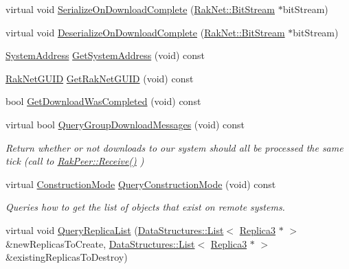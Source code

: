 \begin{DoxyCompactItemize}
\item 
virtual void \hyperlink{class_rak_net_1_1_connection___r_m3_a536d4413a4243b6732bc2a503d14d03e}{Serialize\-On\-Download\-Complete} (\hyperlink{class_rak_net_1_1_bit_stream}{Rak\-Net\-::\-Bit\-Stream} $\ast$bit\-Stream)
\item 
virtual void \hyperlink{class_rak_net_1_1_connection___r_m3_a293a2c18871dc91410953e931d90ca52}{Deserialize\-On\-Download\-Complete} (\hyperlink{class_rak_net_1_1_bit_stream}{Rak\-Net\-::\-Bit\-Stream} $\ast$bit\-Stream)
\item 
\hyperlink{struct_rak_net_1_1_system_address}{System\-Address} \hyperlink{class_rak_net_1_1_connection___r_m3_a4282ffedd8130d793f32ea5bfa2ba0b3}{Get\-System\-Address} (void) const 
\item 
\hyperlink{struct_rak_net_1_1_rak_net_g_u_i_d}{Rak\-Net\-G\-U\-I\-D} \hyperlink{class_rak_net_1_1_connection___r_m3_ad3f7cec74bfac88a3ae095664e6a29c0}{Get\-Rak\-Net\-G\-U\-I\-D} (void) const 
\item 
bool \hyperlink{class_rak_net_1_1_connection___r_m3_a8a5f0389054064ee9d51852ad6ebca05}{Get\-Download\-Was\-Completed} (void) const 
\item 
virtual bool \hyperlink{class_rak_net_1_1_connection___r_m3_aadc711493e2022956fe51ea8592b57d2}{Query\-Group\-Download\-Messages} (void) const 
\begin{DoxyCompactList}\small\item\em Return whether or not downloads to our system should all be processed the same tick (call to \hyperlink{class_rak_net_1_1_rak_peer_a46d90fb903e747f76d63eb3a96543740}{Rak\-Peer\-::\-Receive()} ) \end{DoxyCompactList}\item 
virtual \hyperlink{class_rak_net_1_1_connection___r_m3_a1d176e2d5c47c15ca341d8efaecb637e}{Construction\-Mode} \hyperlink{class_rak_net_1_1_connection___r_m3_a918f5c8d69e2ede6c9469fd9ade96d32}{Query\-Construction\-Mode} (void) const 
\begin{DoxyCompactList}\small\item\em Queries how to get the list of objects that exist on remote systems. \end{DoxyCompactList}\item 
virtual void \hyperlink{class_rak_net_1_1_connection___r_m3_aa560e8d31cfc26b7aef79cc815c916bf}{Query\-Replica\-List} (\hyperlink{class_data_structures_1_1_list}{Data\-Structures\-::\-List}$<$ \hyperlink{class_rak_net_1_1_replica3}{Replica3} $\ast$ $>$ \&new\-Replicas\-To\-Create, \hyperlink{class_data_structures_1_1_list}{Data\-Structures\-::\-List}$<$ \hyperlink{class_rak_net_1_1_replica3}{Replica3} $\ast$ $>$ \&existing\-Replicas\-To\-Destroy)

\end{DoxyCompactItemize}

